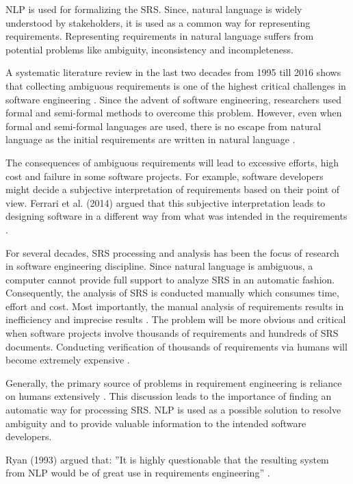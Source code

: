 \begin{multicols}{2}	
	\gls{NLP} is used for formalizing the \gls{SRS}. Since, natural language is widely understood by stakeholders, it is used as a common way for representing requirements. Representing requirements in natural language suffers from potential problems like ambiguity, inconsistency and incompleteness.
	
	A systematic literature review in the last two decades from 1995 till 2016 shows that collecting ambiguous requirements is one of the highest critical challenges in software engineering \cite{Besrour}. Since the advent of software engineering, researchers used formal and semi-formal methods to overcome this problem. However, even when formal and semi-formal languages are used, there is no escape from natural language as the initial requirements are written in natural language \cite{Kamsties}.
	
	The consequences of ambiguous requirements will lead to excessive efforts, high cost and failure in some software projects. For example, software developers might decide a subjective interpretation of requirements based on their point of view. Ferrari et al. (2014) argued that this subjective interpretation leads to designing software in a different way from what was intended in the requirements \cite{Ferrari}.
	
	For several decades, \gls{SRS} processing and analysis has been the focus of research in software engineering discipline. Since natural language is ambiguous, a computer cannot provide full support to analyze \gls{SRS} in an automatic fashion. Consequently, the analysis of \gls{SRS} is conducted manually which consumes time, effort and cost. Most importantly, the manual analysis of requirements results in inefficiency and imprecise results \cite{Wang}. The problem will be more obvious and critical when software projects involve thousands of requirements and hundreds of \gls{SRS} documents. Conducting verification of thousands of requirements via humans will become extremely expensive \cite{Fanmuy}.
	
	Generally, the primary source of problems in requirement engineering is reliance on humans extensively \cite{Ahmed}. This discussion leads to the importance of finding an automatic way for processing \gls{SRS}. \gls{NLP} is used as a possible solution to resolve ambiguity and to provide valuable information to the intended software developers.
	
	Ryan (1993) argued that: ”It is highly questionable that the resulting system from \gls{NLP} would be of great use in requirements engineering” \cite{Ryan}.
	

\end{multicols}
